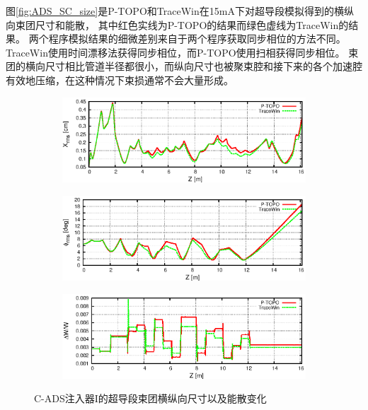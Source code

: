 图\eqref{fig:ADS_SC_size}是P-TOPO和TraceWin在15mA下对超导段模拟得到的横纵向束团尺寸和能散，
其中红色实线为P-TOPO的结果而绿色虚线为TraceWin的结果。
两个程序模拟结果的细微差别来自于两个程序获取同步相位的方法不同。
TraceWin使用时间漂移法获得同步相位，而P-TOPO使用扫相获得同步相位。
束团的横向尺寸相比管道半径都很小，而纵向尺寸也被聚束腔和接下来的各个加速腔有效地压缩，在这种情况下束损通常不会大量形成。
\begin{figure}[!htb]
    \centering
    \begin{subfigure}[b]{0.9\textwidth}
        \includegraphics[width=\textwidth]{Img/ADS_SC_size1.eps}
    \end{subfigure}
    \begin{subfigure}[b]{0.9\textwidth}
        \includegraphics[width=\textwidth]{Img/ADS_SC_size2.eps}
    \end{subfigure}
    \begin{subfigure}[b]{0.9\textwidth}
        \includegraphics[width=\textwidth]{Img/ADS_SC_size3.eps}
    \end{subfigure}
    \caption{C-ADS注入器I的超导段束团横纵向尺寸以及能散变化}\label{fig:ADS_SC_size}
\end{figure}

